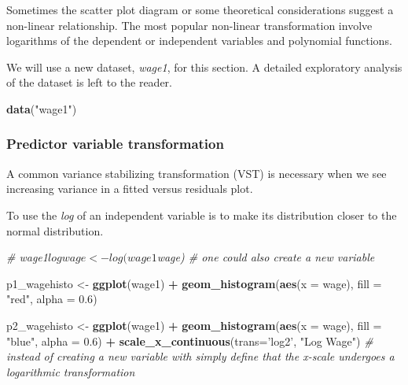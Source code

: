 \documentclass[]{book}
\newenvironment{Shaded}{\begin{snugshade}}{\end{snugshade}}
\newcommand{\CommentTok}[1]{\textcolor[rgb]{0.56,0.35,0.01}{\textit{#1}}}
\newcommand{\DataTypeTok}[1]{\textcolor[rgb]{0.13,0.29,0.53}{#1}}
\newcommand{\FloatTok}[1]{\textcolor[rgb]{0.00,0.00,0.81}{#1}}
\newcommand{\KeywordTok}[1]{\textcolor[rgb]{0.13,0.29,0.53}{\textbf{#1}}}
\newcommand{\NormalTok}[1]{#1}
\newcommand{\OperatorTok}[1]{\textcolor[rgb]{0.81,0.36,0.00}{\textbf{#1}}}
\newcommand{\StringTok}[1]{\textcolor[rgb]{0.31,0.60,0.02}{#1}}
\begin{document}
Sometimes the scatter plot diagram or some theoretical considerations suggest a non-linear relationship. The most popular non-linear transformation involve logarithms of the dependent or independent variables and polynomial functions.

We will use a new dataset, \emph{wage1}, for this section. A detailed exploratory analysis of the dataset is left to the reader.

\begin{Shaded}
\begin{Highlighting}[]
\KeywordTok{data}\NormalTok{(}\StringTok{"wage1"}\NormalTok{)}
\end{Highlighting}
\end{Shaded}

\hypertarget{predictor-variable-transformation}{%
\subsubsection{Predictor variable transformation}\label{predictor-variable-transformation}}

A common variance stabilizing transformation (VST) is necessary when we see increasing variance in a fitted versus residuals plot.

To use the \emph{log} of an independent variable is to make its distribution closer to the normal distribution.

\begin{Shaded}
\begin{Highlighting}[]
\CommentTok{# wage1$logwage <- log(wage1$wage) # one could also create a new variable }

\NormalTok{p1_wagehisto <-}\StringTok{ }\KeywordTok{ggplot}\NormalTok{(wage1)  }\OperatorTok{+}
\StringTok{  }\KeywordTok{geom_histogram}\NormalTok{(}\KeywordTok{aes}\NormalTok{(}\DataTypeTok{x =}\NormalTok{ wage), }\DataTypeTok{fill =} \StringTok{"red"}\NormalTok{, }\DataTypeTok{alpha =} \FloatTok{0.6}\NormalTok{)}

\NormalTok{p2_wagehisto <-}\StringTok{ }\KeywordTok{ggplot}\NormalTok{(wage1)  }\OperatorTok{+}
\StringTok{  }\KeywordTok{geom_histogram}\NormalTok{(}\KeywordTok{aes}\NormalTok{(}\DataTypeTok{x =}\NormalTok{ wage),  }\DataTypeTok{fill =} \StringTok{"blue"}\NormalTok{, }\DataTypeTok{alpha =} \FloatTok{0.6}\NormalTok{) }\OperatorTok{+}
\StringTok{  }\KeywordTok{scale_x_continuous}\NormalTok{(}\DataTypeTok{trans=}\StringTok{'log2'}\NormalTok{, }\StringTok{"Log Wage"}\NormalTok{)  }\CommentTok{# instead of creating a new variable with simply define that the x-scale undergoes a logarithmic transformation}
\end{Highlighting}
\end{Shaded}
\end{document}
